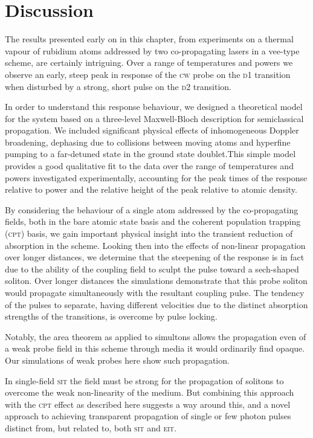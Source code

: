 \section{Discussion}
  \label{sec:simultons_discussion}

  The results presented early on in this chapter, from experiments on a thermal
  vapour of rubidium atoms addressed by two co-propagating lasers in a vee-type
  scheme, are certainly intriguing. Over a range of temperatures and powers we
  observe an early, steep peak in response of the \textsc{cw} probe on the
  \textsc{d1} transition when disturbed by a strong, short pulse on the
  \textsc{d2} transition.

  In order to understand this response behaviour, we designed a theoretical
  model for the system based on a three-level Maxwell-Bloch description for
  semiclassical propagation. We included significant physical effects of
  inhomogeneous Doppler broadening, dephasing due to collisions between moving
  atoms and hyperfine pumping to a far-detuned state in the ground state
  doublet.This simple model provides a good qualitative fit to the data over the
  range of temperatures and powers investigated experimentally, accounting for
  the peak times of the response relative to power and the relative height of
  the peak relative to atomic density.

  By considering the behaviour of a single atom addressed by the co-propagating
  fields, both in the bare atomic state basis and the coherent population
  trapping (\textsc{cpt}) basis, we gain important physical insight into the
  transient reduction of absorption in the scheme. Looking then into the effects
  of non-linear propagation over longer distances, we determine that the
  steepening of the response is in fact due to the ability of the coupling field
  to sculpt the pulse toward a sech-shaped soliton. Over longer distances the
  simulations demonstrate that this probe soliton would propagate simultaneously
  with the resultant coupling pulse. The tendency of the pulses to separate,
  having different velocities due to the distinct absorption strengths of the
  transitions, is overcome by pulse locking.

  Notably, the area theorem as applied to simultons allows the propagation even
  of a weak probe field in this scheme through media it would ordinarily find
  opaque. Our simulations of weak probes here show such propagation.

  In single-field \textsc{sit} the field must be strong for the propagation of
  solitons to overcome the weak non-linearity of the medium. But combining this
  approach with the \textsc{cpt} effect as described here suggests a way around
  this, and a novel approach to achieving transparent propagation of single or
  few photon pulses distinct from, but related to, both \textsc{sit} and
  \textsc{eit}.

